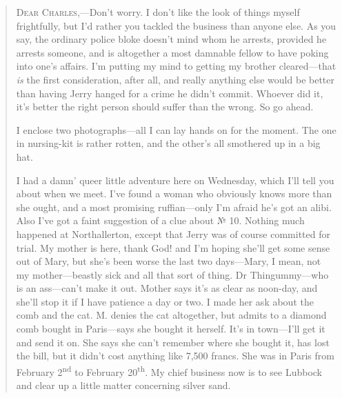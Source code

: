 \begin{quotation}

\textsc{Dear Charles},—Don't worry. I don't like the look of things myself frightfully, but I'd rather you tackled the business than anyone else. As you say, the ordinary police bloke doesn't mind whom he arrests, provided he arrests someone, and is altogether a most damnable fellow to have poking into one's affairs. I'm putting my mind to getting my brother cleared—that \textit{is} the first consideration, after all, and really anything else would be better than having Jerry hanged for a crime he didn't commit. Whoever did it, it's better the right person should suffer than the wrong. So go ahead.

I enclose two photographs—all I can lay hands on for the moment. The one in nursing-kit is rather rotten, and the other's all smothered up in a big hat.

I had a damn' queer little adventure here on Wednesday, which I'll tell you about when we meet. I've found a woman who obviously knows more than she ought, and a most promising ruffian—only I'm afraid he's got an alibi. Also I've got a faint suggestion of a clue about № 10. Nothing much happened at Northallerton, except that Jerry was of course committed for trial. My mother is here, thank God! and I'm hoping she'll get some sense out of Mary, but she's been worse the last two days—Mary, I mean, not my mother—beastly sick and all that sort of thing. Dr Thingummy—who is an ass—can't make it out. Mother says it's as clear as noon-day, and she'll stop it if I have patience a day or two. I made her ask about the comb and the cat. M. denies the cat altogether, but admits to a diamond comb bought in Paris—says she bought it herself. It's in town—I'll get it and send it on. She says she can't remember where she bought it, has lost the bill, but it didn't cost anything like 7,500 francs. She was in Paris from February 2\textsuperscript{nd} to February 20\textsuperscript{th}. My chief business now is to see Lubbock and clear up a little matter concerning silver sand.


\end{quotation}
